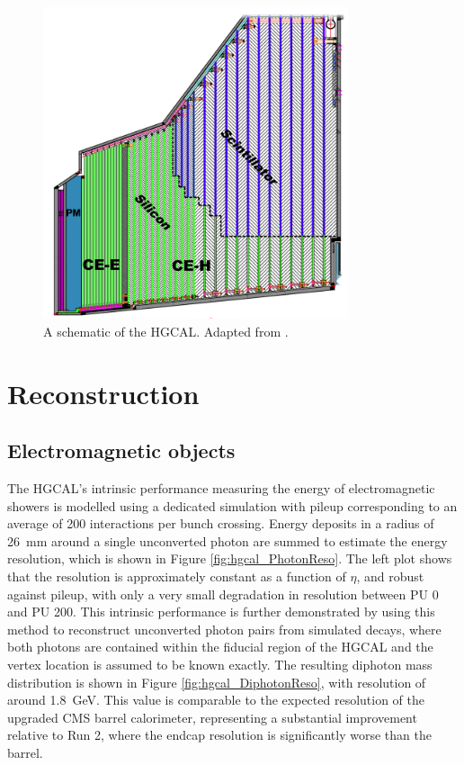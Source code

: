 \begin{figure}[h!]
  \centering
  \includegraphics[width=0.8\textwidth]{Figures/HGCAL/TheHGCAL.png}
  \caption{A schematic of the HGCAL. Adapted from \cite{HGCAL}.}
  \label{fig:hgcal_TheHGCAL}
\end{figure}

\section{Reconstruction}

\subsection{Electromagnetic objects}

The HGCAL's intrinsic performance measuring the energy of electromagnetic showers is modelled using a dedicated simulation with pileup corresponding to an average of 200 interactions per bunch crossing. 
Energy deposits in a radius of \SI{26}{mm} around a single unconverted photon are summed to estimate the energy resolution, which is shown in Figure \ref{fig:hgcal_PhotonReso}. %
The left plot shows that the resolution is approximately constant as a function of $\eta$, and robust against pileup, with only a very small degradation in resolution between PU 0 and PU 200.
This intrinsic performance is further demonstrated by using this method to reconstruct unconverted photon pairs from simulated \Hgg decays, 
where both photons are contained within the fiducial region of the HGCAL and the vertex location is assumed to be known exactly. 
The resulting diphoton mass distribution is shown in Figure \ref{fig:hgcal_DiphotonReso}, with resolution of around \SI{1.8}{GeV}.
This value is comparable to the expected resolution of the upgraded CMS barrel calorimeter, 
representing a substantial improvement relative to Run 2, where the endcap resolution is significantly worse than the barrel. %

